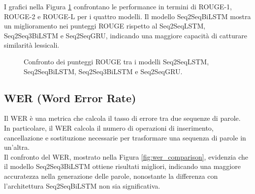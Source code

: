 I grafici nella Figura \ref{fig:rouge_comparison} confrontano le performance in termini di ROUGE-1, ROUGE-2 e ROUGE-L per i quattro modelli. Il modello Seq2SeqBiLSTM mostra un miglioramento nei punteggi ROUGE rispetto al Seq2SeqLSTM, Seq2Seq3BiLSTM e Seq2SeqGRU, indicando una maggiore capacit\`a di catturare similarit\`a lessicali.
\begin{figure}[H]
    \centering
    \hfill
    \hfill
    \hfill
    \hfill

    \hfill
    \hfill
    \hfill
    \hfill

    \hfill
    \hfill
    \hfill
    \hfill

    \caption{Confronto dei punteggi ROUGE tra i modelli Seq2SeqLSTM, Seq2SeqBiLSTM, Seq2Seq3BiLSTM e Seq2SeqGRU.}
    \label{fig:rouge_comparison}
\end{figure}

\subsection{WER (Word Error Rate)}
Il WER \`e una metrica che calcola il tasso di errore tra due sequenze di parole.\\
In particolare, il WER calcola il numero di operazioni di inserimento, cancellazione e sostituzione necessarie per trasformare una sequenza di parole in un'altra.\\

Il confronto del WER, mostrato nella Figura \ref{fig:wer_comparison}, evidenzia che il modello Seq2Seq3BiLSTM ottiene risultati migliori, indicando una maggiore accuratezza nella generazione delle parole, nonostante la differenza con l'architettura Seq2SeqBiLSTM non sia significativa.\\

